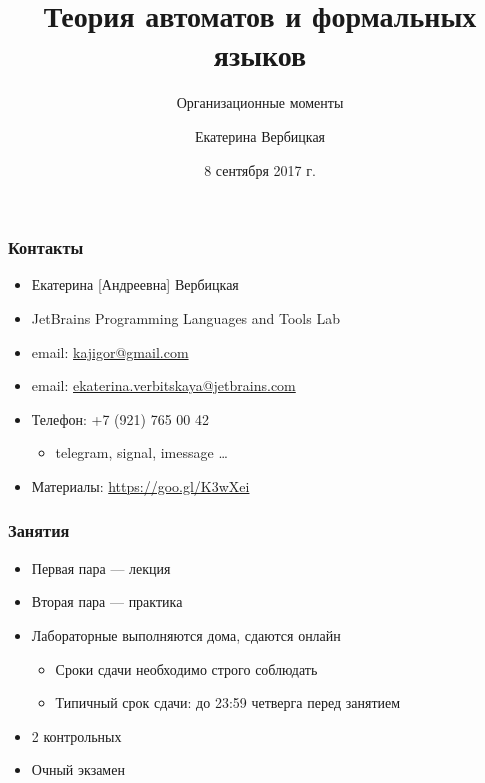\documentclass{beamer}
\title[]{Теория автоматов и формальных языков}
\subtitle[]{Организационные моменты}
\institute[]{
Санкт-Петербургский государственный электротехнический университет <<ЛЭТИ>>\\
}
\author[]{Екатерина Вербицкая}
\date{8 сентября 2017 г.}
\begin{document}
{
\begin{frame}
  \titlepage
\end{frame}

}

\begin{frame}[fragile]
  \transwipe[direction=90]
  \frametitle{Контакты}
  \begin{itemize}
    \item Екатерина [Андреевна] Вербицкая
    \item JetBrains Programming Languages and Tools Lab 
    \item email: \href{mailto:kajigor@gmail.com}{kajigor@gmail.com}
    \item email: \href{mailto:ekaterina.verbitskaya@jetbrains.com}{ekaterina.verbitskaya@jetbrains.com} 
    \item Телефон: +7 (921) 765 00 42
    \begin{itemize}
      \item telegram, signal, imessage \dots
    \end{itemize}
    \item Материалы: \href{https://goo.gl/K3wXei}{https://goo.gl/K3wXei}
  \end{itemize}
\end{frame}

\begin{frame}[fragile]
  \transwipe[direction=90]
  \frametitle{Занятия}
  \begin{itemize}
    \item Первая пара --- лекция
    \item Вторая пара --- практика
    \item Лабораторные выполняются дома, сдаются онлайн
    \begin{itemize}
      \item Сроки сдачи необходимо строго соблюдать
      \item Типичный срок сдачи: до 23:59 четверга перед занятием
    \end{itemize}
    \item 2 контрольных
    \item Очный экзамен
  \end{itemize}
\end{frame}
\end{document}
